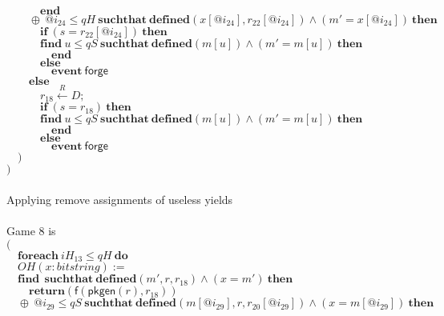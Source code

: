 \documentclass{article}
\newcommand{\store}{\leftarrow}
\newcommand{\getR}{\stackrel{R}{\store}}
\newcommand{\kw}[1]{\mathbf{#1}}
\newcommand{\kwf}[1]{\mathsf{#1}}
\newcommand{\var}[1]{\mathit{#1}}
\newcommand{\kwt}[1]{\mathit{#1}}
\newcommand{\kwp}[1]{\mathit{#1}}
\begin{document}
\begin{tabbing}
$\quad \quad \quad \kw{end}$\\
$\quad \quad \oplus\ \var{@i}_{24} \leq \kwp{qH}\ \kw{suchthat}\ \kw{defined}(\var{x}[\var{@i}_{24}], \var{r}_{22}[\var{@i}_{24}])\wedge (\var{m'}  =  \var{x}[\var{@i}_{24}])\ \kw{then}$\\
$\quad \quad \quad \kw{if}\ (\var{s}  =  \var{r}_{22}[\var{@i}_{24}])\ \kw{then}$\\
$\quad \quad \quad \kw{find}\ \var{u} \leq \kwp{qS}\ \kw{suchthat}\ \kw{defined}(\var{m}[\var{u}])\wedge (\var{m'}  =  \var{m}[\var{u}])\ \kw{then}$\\
$\quad \quad \quad \quad \kw{end}$\\
$\quad \quad \quad \kw{else}$\\
$\quad \quad \quad \quad \kw{event}\ \kwf{forge}$\\
$\quad \quad \kw{else}$\\
$\quad \quad \quad \var{r}_{18} \getR \kwt{D};$\\
$\quad \quad \quad \kw{if}\ (\var{s}  =  \var{r}_{18})\ \kw{then}$\\
$\quad \quad \quad \kw{find}\ \var{u} \leq \kwp{qS}\ \kw{suchthat}\ \kw{defined}(\var{m}[\var{u}])\wedge (\var{m'}  =  \var{m}[\var{u}])\ \kw{then}$\\
$\quad \quad \quad \quad \kw{end}$\\
$\quad \quad \quad \kw{else}$\\
$\quad \quad \quad \quad \kw{event}\ \kwf{forge}$\\
$\quad )$\\
$)$\\
$ $\\
\\
Applying remove assignments of useless yields\\
\\
Game 8 is\\
$($\\
$\quad \kw{foreach}\ \var{iH}_{13} \leq \kwp{qH}\ \kw{do}$\\
$\quad OH(\var{x}: \kwt{bitstring}) :=$\\
$\quad \kw{find}\ \ \kw{suchthat}\ \kw{defined}(\var{m'}, \var{r}, \var{r}_{18})\wedge (\var{x}  =  \var{m'})\ \kw{then}$\\
$\quad \quad \kw{return}\kwf{}(\kwf{f}(\kwf{pkgen}(\var{r}), \var{r}_{18}))$\\
$\quad \oplus\ \var{@i}_{29} \leq \kwp{qS}\ \kw{suchthat}\ \kw{defined}(\var{m}[\var{@i}_{29}], \var{r}, \var{r}_{20}[\var{@i}_{29}])\wedge (\var{x}  =  \var{m}[\var{@i}_{29}])\ \kw{then}$\\

\end{tabbing}
\end{document}
